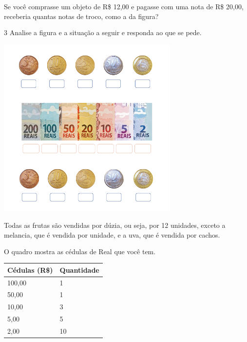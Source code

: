 Se você comprasse um objeto de R\$ 12,00 e pagasse com uma nota de R\$
20,00, receberia quantas notas de troco, como a da figura?


\num{3} Analise a figura e a situação a seguir e responda ao que se pede.



\includegraphics[width=3.55208in,height=3.57292in]{media/image71.png}

Todas as frutas são vendidas por dúzia, ou seja, por 12 unidades, exceto
a melancia, que é vendida por unidade, e a uva, que é vendida por cachos.

O quadro mostra as cédulas de Real que você tem.

\begin{longtable}[]{@{}ll@{}}
\toprule
Cédulas (R\$) & Quantidade\tabularnewline
\midrule
\endhead
100,00 & 1\tabularnewline
50,00 & 1\tabularnewline
10,00 & 3\tabularnewline
5,00 & 5\tabularnewline
2,00 & 10\tabularnewline
\bottomrule
\end{longtable}

